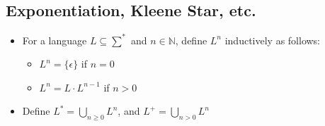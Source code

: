 \documentclass[12pt]{article}
\begin{document}
\subsection{Exponentiation, Kleene Star, etc.}
\begin{itemize}
    \item For a language $L \subseteq \sum^{\ast}$ and $n \in \mathbb{N}$, define $L^n$ inductively as follows:
        \begin{itemize}
            \item $L^n = \{ \epsilon \}$ if $n = 0$
            \item $L^n = L \cdot L^{n - 1}$ if $n > 0$
        \end{itemize}
    \item Define $L^{\ast} = \bigcup_{n \geq 0} L^n$, and $L^+ = \bigcup_{n > 0} L^n$
\end{itemize}
\end{document}
